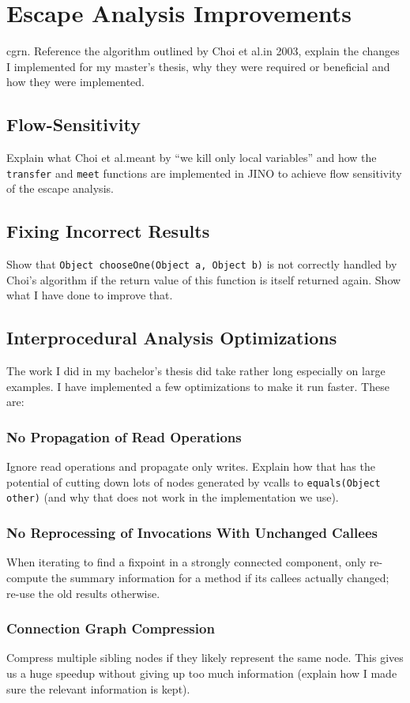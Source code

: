 
\chapter{Escape Analysis Improvements}
	\label{chapter:changes-eea}

	\Gls{cgrn}.
	Reference the algorithm outlined by Choi et al.\@ in 2003, explain the changes I implemented for my master's thesis,
	why they were required or beneficial and how they were implemented.

	\section{Flow-Sensitivity}
		\label{sec:changes-eea:flow-sensitive}
		Explain what Choi et al.\@ meant by \enquote{we kill only local variables} and how the \texttt{transfer} and
		\texttt{meet} functions are implemented in JINO to achieve flow sensitivity of the escape analysis.

	\section{Fixing Incorrect Results}
		\label{sec:changes-eea:bug}
		Show that \texttt{Object chooseOne(Object a, Object b)} is not correctly handled by Choi's algorithm if the return
		value of this function is itself returned again. Show what I have done to improve that.

	\section{Interprocedural Analysis Optimizations}
		\label{sec:changes-eea:opt}
		The work I did in my bachelor's thesis did take rather long especially on large examples. I have implemented a few
		optimizations to make it run faster. These are:
		
		\subsection{No Propagation of Read Operations}
			\label{sub:changes-eea:opt:writeonly}
			Ignore read operations and propagate only writes. Explain how that has the potential of cutting down lots of nodes
			generated by vcalls to \texttt{equals(Object other)} (and why that does not work in the implementation we use).

		\subsection{No Reprocessing of Invocations With Unchanged Callees}
			\label{sub:changes-eea:opt:quick-fixpoint}
			When iterating to find a fixpoint in a strongly connected component, only re-compute the summary information for
			a method if its callees actually changed; re-use the old results otherwise.

		\subsection{Connection Graph Compression}
			\label{sub:changes-eea:opt:compression}
			Compress multiple sibling nodes if they likely represent the same node. This gives us a huge speedup without
			giving up too much information (explain how I made sure the relevant information is kept).
